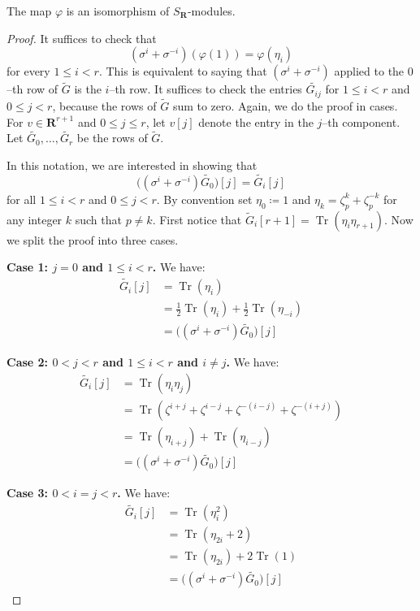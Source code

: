 \documentclass[10pt,a4paper]{amsart}
\DeclareMathOperator{\Tr}{Tr}
\newcommand{\RR}{\mathbf{R}}
\begin{document}
\begin{proposition}
\label{p:equivariant}
The map $\varphi$ is an isomorphism of $S_{\RR}$-modules.
\end{proposition}

\begin{proof}
It suffices to check that 
\[
    (\sigma^i + \sigma^{-i})(\varphi(1)) = \varphi(\eta_i)
\]
for every $1 \leq i < r$.  This is equivalent to saying that $(\sigma^i + \sigma^{-i})$ applied to the $0$--th row of $\widetilde{G}$ is the $i$--th row. It suffices to check the entries $\widetilde{G_{ij}}$ for $1 \leq i < r$ and $0 \leq j < r$, because the rows of $\widetilde{G}$ sum to zero. Again, we do the proof in cases. For $v \in \RR^{r+1}$ and $0 \leq j \leq r$, let $v[j]$ denote the entry in the $j$--th component. Let $\widetilde{G_0},\dots,\widetilde{G_r}$ be the rows of $\widetilde{G}$. 

In this notation, we are interested in showing that
\[
    \bigg((\sigma^i + \sigma^{-i})\widetilde{G_0}\bigg)[j] = \widetilde{G_i}[j]
\]
for all $1 \leq i < r$ and $0 \leq j < r$. By convention set $\eta_0 \coloneqq 1$ and $\eta_k = \zeta_p^k + \zeta_p^{-k}$ for any integer $k$ such that $p \neq k$. First notice that $\widetilde{G}_i[r+1] = \Tr(\eta_i\eta_{r+1})$. Now we split the proof into three cases.

\noindent \textbf{Case 1: $j = 0$ and $1 \leq i < r$.} We have:
\begin{align*}
\widetilde{G_i}[j] &= \Tr(\eta_i) \\
&= \frac{1}{2}\Tr(\eta_i) + \frac{1}{2}\Tr(\eta_{-i}) \\
&= \bigg((\sigma^i + \sigma^{-i})\widetilde{G_0}\bigg)[j]
\end{align*}

\noindent \textbf{Case 2: $0 < j < r$ and $1 \leq i < r$ and $i \neq j$.} We have:
\begin{align*}
\widetilde{G_i}[j] &= \Tr(\eta_i \eta_j) \\
&= \Tr(\zeta^{i+j}+\zeta^{i-j}+\zeta^{-(i-j)}+\zeta^{-(i+j)}) \\
&= \Tr(\eta_{i + j}) + \Tr(\eta_{i - j}) \\
&= \bigg((\sigma^i + \sigma^{-i})\widetilde{G_0}\bigg)[j]
\end{align*}

\noindent \textbf{Case 3: $0 < i = j < r$.} We have:
\begin{align*}
\widetilde{G_i}[j] &= \Tr(\eta_i^2) \\
&= \Tr(\eta_{2i}+2) \\
&= \Tr(\eta_{2i}) + 2\Tr(1) \\
&= \bigg((\sigma^i + \sigma^{-i})\widetilde{G_0}\bigg)[j]
\end{align*}
\noindent
\end{proof}
\end{document}
